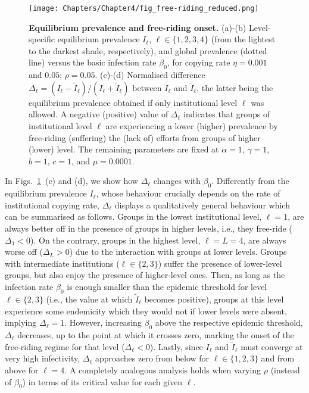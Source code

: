 \begin{figure}
  \centering	
    \texttt{[image: Chapters/Chapter4/fig\_free-riding\_reduced.png]}  
  \caption[Equilibrium prevalence and free-riding onset.]{ \textbf{Equilibrium prevalence and free-riding onset.}
  (a)-(b) Level-specific equilibrium prevalence $I_\ell$, $\ell\in\{1,2,3,4\}$ (from the lightest to the darkest shade, respectively), and global prevalence (dotted line) versus the basic infection rate $\beta_0$, for copying rate $\eta=0.001$ and $0.05$; $\rho = 0.05$. (c)-(d) Normalised difference $\Delta_\ell = (I_\ell - \tilde{I}_\ell)/(I_\ell + \tilde{I}_\ell)$ between $I_\ell$ and $\tilde{I}_\ell$, the latter being the equilibrium prevalence obtained if only institutional level $\ell$ was allowed. A negative (positive) value of $\Delta_\ell$ indicates that groups of institutional level $\ell$ are experiencing a lower (higher) prevalence by free-riding (suffering) the (lack of) efforts from groups of higher (lower) level. The remaining parameters are fixed at $\alpha=1$, $\gamma=1$, $b=1$, $c=1$, and $\mu = 0.0001$.
  }
  \label{fig:free_riding}
\end{figure}

In Figs.~\ref{fig:free_riding}~(c) and (d), we show how $\Delta_\ell$ changes with $\beta_0$. Differently from the equilibrium prevalence $I_\ell$, whose behaviour crucially depends on the rate of institutional copying rate, $\Delta_\ell$ displays a qualitatively general behaviour which can be summarised as follows. Groups in the lowest institutional level, $\ell = 1$, are always better off in the presence of groups in higher levels, i.e., they free-ride ($\Delta_1 < 0$). On the contrary, groups in the highest level, $\ell = L = 4$, are always worse off ($\Delta_L > 0$) due to the interaction with groups at lower levels. Groups with intermediate institutions ($\ell \in \{2, 3\}$) suffer the presence of lower-level groups, but also enjoy the presence of higher-level ones. Then, as long as the infection rate $\beta_0$ is enough smaller than the epidemic threshold for level $\ell \in \{2, 3\}$ (i.e., the value at which $\tilde{I}_\ell$ becomes positive), groups at this level experience some endemicity which they would not if lower levels were absent, implying $\Delta_\ell = 1$. However, increasing $\beta_0$ above the respective epidemic threshold, $\Delta_\ell$ decreases, up to the point at which it crosses zero, marking the onset of the free-riding regime for that level ($\Delta_\ell < 0$). Lastly, since $I_\ell$ and $\tilde{I}_\ell$ must converge at very high infectivity, $\Delta_\ell$ approaches zero from below for $\ell \in \{1, 2, 3\}$ and from above for $\ell = 4$. A completely analogous analysis holds when varying $\rho$ (instead of $\beta_0$) in terms of its critical value for each given $\ell$.


